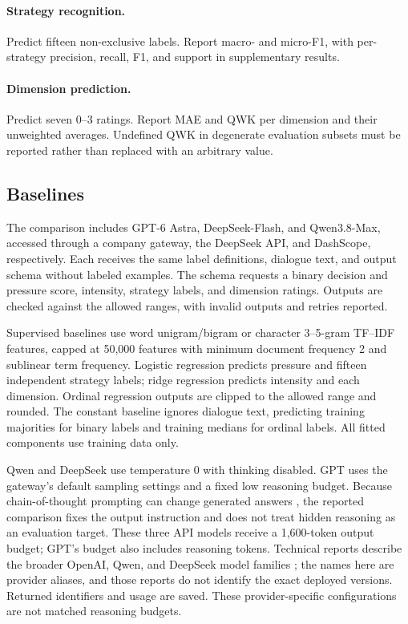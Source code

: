 \documentclass[11pt]{article}
\begin{document}
\paragraph{Strategy recognition.}
Predict fifteen non-exclusive labels. Report macro- and micro-F1, with
per-strategy precision, recall, F1, and support in supplementary results.
\paragraph{Dimension prediction.}
Predict seven 0--3 ratings. Report MAE and QWK per dimension and their
unweighted averages. Undefined QWK in degenerate evaluation subsets must
be reported rather than replaced with an arbitrary value.

\subsection{Baselines}
The comparison includes GPT-6 Astra, DeepSeek-Flash, and
Qwen3.8-Max, accessed through a company gateway, the DeepSeek API, and
DashScope, respectively. Each receives the same label
definitions, dialogue text, and output schema without labeled examples.
The schema requests a binary decision and pressure score, intensity,
strategy labels, and dimension ratings. Outputs are checked against
the allowed ranges, with invalid outputs and retries reported.

Supervised baselines use word unigram/bigram or character 3--5-gram TF--IDF
features, capped at 50,000 features with minimum document frequency 2 and
sublinear term frequency. Logistic regression predicts pressure and fifteen
independent strategy labels; ridge regression predicts intensity and each
dimension. Ordinal regression outputs are clipped to the allowed range and
rounded. The constant baseline ignores dialogue text, predicting training
majorities for binary labels and training medians for ordinal labels.
All fitted components use training data only.

Qwen and DeepSeek use temperature 0 with thinking disabled. GPT uses the
gateway's default sampling settings and a fixed low reasoning budget. Because
chain-of-thought prompting can change generated answers \citep{wei2022},
the reported comparison fixes the output instruction and does not treat
hidden reasoning as an evaluation target. These three API models receive a
1,600-token output budget; GPT's budget also includes reasoning tokens.
Technical reports describe the broader OpenAI, Qwen, and DeepSeek model
families \citep{openai2023,qwen2025,deepseek2024}; the names here are provider
aliases, and those reports do not identify the exact deployed versions.
Returned identifiers and usage are saved.
These provider-specific configurations are not matched reasoning budgets.
\end{document}
